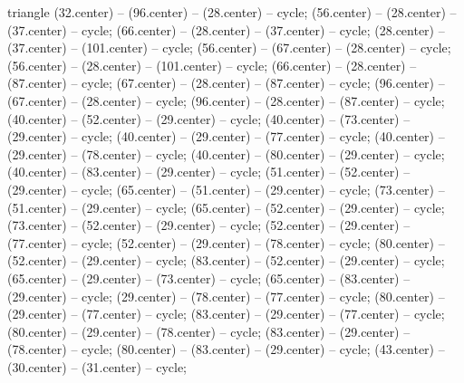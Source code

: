 \begin{pgfonlayer}{triangle}
 (32.center) -- (96.center) -- (28.center) -- cycle; 
 (56.center) -- (28.center) -- (37.center) -- cycle; 
 (66.center) -- (28.center) -- (37.center) -- cycle; 
 (28.center) -- (37.center) -- (101.center) -- cycle; 
 (56.center) -- (67.center) -- (28.center) -- cycle; 
 (56.center) -- (28.center) -- (101.center) -- cycle; 
 (66.center) -- (28.center) -- (87.center) -- cycle; 
 (67.center) -- (28.center) -- (87.center) -- cycle; 
 (96.center) -- (67.center) -- (28.center) -- cycle; 
 (96.center) -- (28.center) -- (87.center) -- cycle; 
 (40.center) -- (52.center) -- (29.center) -- cycle; 
 (40.center) -- (73.center) -- (29.center) -- cycle; 
 (40.center) -- (29.center) -- (77.center) -- cycle; 
 (40.center) -- (29.center) -- (78.center) -- cycle; 
 (40.center) -- (80.center) -- (29.center) -- cycle; 
 (40.center) -- (83.center) -- (29.center) -- cycle; 
 (51.center) -- (52.center) -- (29.center) -- cycle; 
 (65.center) -- (51.center) -- (29.center) -- cycle; 
 (73.center) -- (51.center) -- (29.center) -- cycle; 
 (65.center) -- (52.center) -- (29.center) -- cycle; 
 (73.center) -- (52.center) -- (29.center) -- cycle; 
 (52.center) -- (29.center) -- (77.center) -- cycle; 
 (52.center) -- (29.center) -- (78.center) -- cycle; 
 (80.center) -- (52.center) -- (29.center) -- cycle; 
 (83.center) -- (52.center) -- (29.center) -- cycle; 
 (65.center) -- (29.center) -- (73.center) -- cycle; 
 (65.center) -- (83.center) -- (29.center) -- cycle; 
 (29.center) -- (78.center) -- (77.center) -- cycle; 
 (80.center) -- (29.center) -- (77.center) -- cycle; 
 (83.center) -- (29.center) -- (77.center) -- cycle; 
 (80.center) -- (29.center) -- (78.center) -- cycle; 
 (83.center) -- (29.center) -- (78.center) -- cycle; 
 (80.center) -- (83.center) -- (29.center) -- cycle; 
 (43.center) -- (30.center) -- (31.center) -- cycle; 

\end{pgfonlayer}
